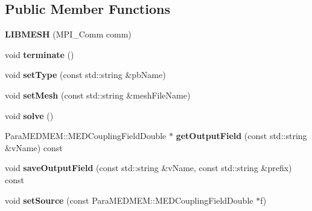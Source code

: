 \subsection*{Public Member Functions}
\begin{DoxyCompactItemize}
\item 
\hypertarget{class_l_i_b_m_e_s_h_a884f0cd9f294da8e7a23d3e03a8b6260}{{\bfseries L\-I\-B\-M\-E\-S\-H} (M\-P\-I\-\_\-\-Comm comm)}\label{class_l_i_b_m_e_s_h_a884f0cd9f294da8e7a23d3e03a8b6260}

\item 
\hypertarget{class_l_i_b_m_e_s_h_a4ebee9e21f12098cdcc50a7cc87c70b4}{void {\bfseries terminate} ()}\label{class_l_i_b_m_e_s_h_a4ebee9e21f12098cdcc50a7cc87c70b4}

\item 
\hypertarget{class_l_i_b_m_e_s_h_a9ffabbac5606f42ebaf2286eaadc1ac5}{void {\bfseries set\-Type} (const std\-::string \&pb\-Name)}\label{class_l_i_b_m_e_s_h_a9ffabbac5606f42ebaf2286eaadc1ac5}

\item 
\hypertarget{class_l_i_b_m_e_s_h_a0e16b3aa46db4ee9986eafe20e6080dd}{void {\bfseries set\-Mesh} (const std\-::string \&mesh\-File\-Name)}\label{class_l_i_b_m_e_s_h_a0e16b3aa46db4ee9986eafe20e6080dd}

\item 
\hypertarget{class_l_i_b_m_e_s_h_af12649c692b3e81ece14fae8767b7d79}{void {\bfseries solve} ()}\label{class_l_i_b_m_e_s_h_af12649c692b3e81ece14fae8767b7d79}

\item 
\hypertarget{class_l_i_b_m_e_s_h_a9241ce2d728502e34491e08441d7e69d}{Para\-M\-E\-D\-M\-E\-M\-::\-M\-E\-D\-Coupling\-Field\-Double $\ast$ {\bfseries get\-Output\-Field} (const std\-::string \&v\-Name) const }\label{class_l_i_b_m_e_s_h_a9241ce2d728502e34491e08441d7e69d}

\item 
\hypertarget{class_l_i_b_m_e_s_h_aae9f756e18bbc1840a0fce89c7fdd698}{void {\bfseries save\-Output\-Field} (const std\-::string \&v\-Name, const std\-::string \&prefix) const }\label{class_l_i_b_m_e_s_h_aae9f756e18bbc1840a0fce89c7fdd698}

\item 
\hypertarget{class_l_i_b_m_e_s_h_a78890b3c164cf0f7077e3039246a8587}{void {\bfseries set\-Source} (const Para\-M\-E\-D\-M\-E\-M\-::\-M\-E\-D\-Coupling\-Field\-Double $\ast$f)}\label{class_l_i_b_m_e_s_h_a78890b3c164cf0f7077e3039246a8587}


\end{DoxyCompactItemize}
